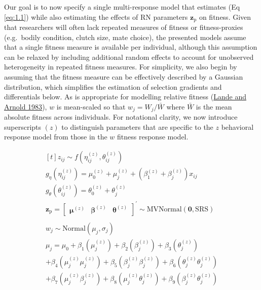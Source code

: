 \documentclass{article}
\begin{document}
Our goal is to now specify a single multi-response model that estimates
(Eq \ref{eq:1.1}) while also estimating the effects of RN parameters
\(\boldsymbol{z_{\mathrm{p}}}\) on fitness. Given that researchers will
often lack repeated measures of fitness or fitness-proxies (e.g.~bodily
condition, clutch size, mate choice), the presented models assume that a
single fitness measure is available per individual, although this
assumption can be relaxed by including additional random effects to
account for unobserved heterogeneity in repeated fitness measures. For
simplicity, we also begin by assuming that the fitness measure can be
effectively described by a Gaussian distribution, which simplifies the
estimation of selection gradients and differentials below. As is
appropriate for modelling relative fitness
(\protect\hyperlink{ref-Lande1983}{Lande and Arnold 1983}), \(w\) is
mean-scaled so that \(w_j = W_j/\bar{W}\) where \(\bar{W}\) is the mean
absolute fitness across individuals. For notational clarity, we now
introduce superscripts \((z)\) to distinguish parameters that are
specific to the \(z\) behavioral response model from those in the \(w\)
fitness response model.

\begin{equation} \tag{1.2}\label{eq:1.2}
\begin{gathered}[t]
z_{ij} \sim f \left(\eta^{(z)}_{ij }, \theta^{(z)}_{ij} \right)  \\
g_\eta \left( \eta^{(z)}_{ij} \right) = \mu_0^{(z)} + \mu_j^{(z)}+ \left(\beta_1^{(z)} + \beta_j^{(z)} \right) x_{ij} \nonumber \\
g_\theta \left( \theta^{(z)}_{ij} \right) = \theta_0^{(z)} + \theta_{j}^{(z)} \nonumber \\
\boldsymbol{z_{\mathrm{p}}} = \begin{bmatrix}
\boldsymbol{\mu}^{(z)} &
\boldsymbol{\beta}^{(z)} &
\boldsymbol{\theta}^{(z)} \end{bmatrix} ^{\prime}
 \sim \mathrm{M}\mathrm{VNormal} \left(
\boldsymbol{0},\boldsymbol{\mathrm{S}}\boldsymbol{\mathrm{R}}\boldsymbol{\mathrm{S}} \right) \nonumber \\ 
\nonumber \\
w_{j} \sim \mathrm{Normal} \left( \mu_{j}, \sigma _{j} \right) \nonumber \\
\mu _{j} = \mu_0 + \beta_1 \left( \mu^{(z)}_{j} \right) + 
                \beta_2 \left( \beta_j^{(z)} \right) + 
                \beta_3 \left( \theta^{(z)}_{j} \right)  \nonumber  \\ 
                + \beta_4 \left( \mu^{(z)}_j \mu^{(z)}_j \right) +
                \beta_5\left( \beta^{(z)}_j \beta^{(z)}_j \right) +
                \beta_6 \left( \theta^{(z)}_j \theta^{(z)}_j \right)\\ 
                +  \beta_7 \left( \mu^{(z)}_j \beta^{(z)}_j \right) + 
                \beta_8 \left( \mu^{(z)}_j \theta^{(z)}_j \right) + 
                 \beta_9 \left( \beta^{(z)}_j \theta^{(z)}_j \right) \nonumber \\ 
\end{gathered}
\end{equation}
\end{document}
